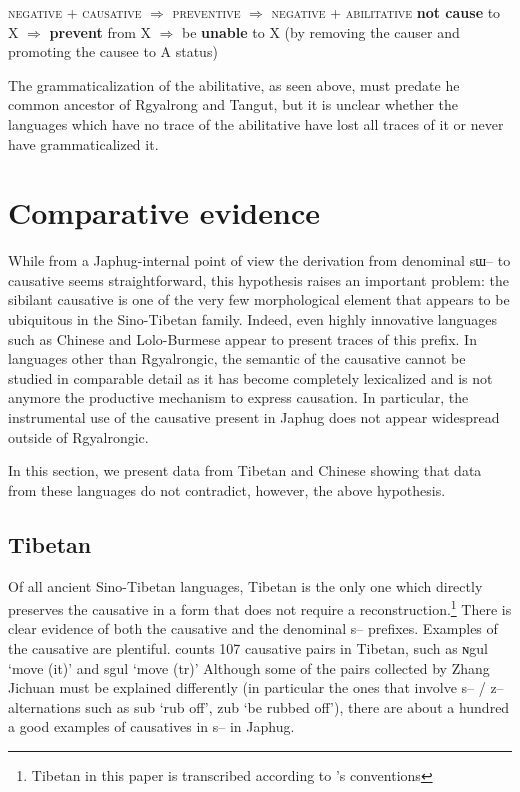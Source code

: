 \documentclass[oldfontcommands,oneside,a4paper,11pt]{article}
\newcommand{\ipa}[1]{{\phon \mbox{#1}}} %
\begin{document}
{\small
\begin{exe}
\ex \label{ex:pathway2}
\glt \textsc{negative}   + \textsc{causative} $\Rightarrow$ \textsc{preventive} $\Rightarrow$ \textsc{negative} +  \textsc{abilitative} 
\glt \textbf{not cause} to X $\Rightarrow$ \textbf{prevent} from X $\Rightarrow$ be \textbf{unable} to X (by removing the causer and promoting the causee to A status)
\end{exe}
}


The grammaticalization of the abilitative, as seen above, must predate he common ancestor of Rgyalrong and Tangut, but it is unclear whether the languages which have no trace of the abilitative have lost all traces of it or never have grammaticalized it.

\section{Comparative evidence}

 While from a Japhug-internal point of view the derivation from denominal \ipa{sɯ--} to causative seems straightforward, this hypothesis raises an important problem:  the sibilant causative is one of the very few morphological element that appears to be ubiquitous in the Sino-Tibetan family. Indeed, even highly innovative languages such as Chinese and Lolo-Burmese appear to present  traces of this prefix. In languages other than Rgyalrongic, the semantic of the causative cannot be studied in comparable detail as it has become completely lexicalized and is not anymore the productive mechanism to express causation. In particular, the instrumental use of the causative present in Japhug does not appear widespread outside of Rgyalrongic.
 
 In this section, we present data from Tibetan and Chinese showing that data from these languages do not contradict, however, the above hypothesis.

 
\subsection{Tibetan}

Of all ancient Sino-Tibetan languages, Tibetan is the only one which directly preserves the causative in a form that does not require a reconstruction.\footnote{Tibetan in this paper is transcribed according to \citet{jacques12transcription}'s conventions} There is clear evidence of both the causative and the denominal \ipa{s--} prefixes.  Examples of the causative are plentiful. \citet[210-8]{zhang09cizu} counts 107 causative pairs in Tibetan, such as \ipa{ɴgul} `move (it)' and \ipa{sgul} `move (tr)' Although some of the pairs collected by Zhang Jichuan must be explained differently (in particular the ones that involve \ipa{s--} / \ipa{z--} alternations such as \ipa{sub} `rub off', \ipa{zub} `be rubbed off'), there are about a hundred a good examples of causatives in \ipa{s--} in Japhug.
\end{document}
